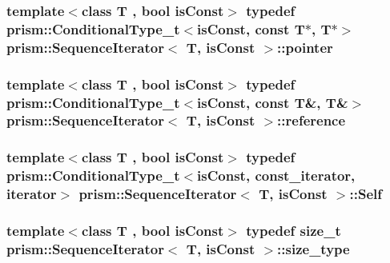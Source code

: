 \subsubsection[{\texorpdfstring{pointer}{pointer}}]{\setlength{\rightskip}{0pt plus 5cm}template$<$class T , bool is\+Const$>$ typedef {\bf prism\+::\+Conditional\+Type\+\_\+t}$<$is\+Const, const T$\ast$, T$\ast$$>$ {\bf prism\+::\+Sequence\+Iterator}$<$ T, is\+Const $>$\+::{\bf pointer}}\hypertarget{structprism_1_1_sequence_iterator_a024492122445836e94097e10b02b700a}{}\label{structprism_1_1_sequence_iterator_a024492122445836e94097e10b02b700a}
\subsubsection[{\texorpdfstring{reference}{reference}}]{\setlength{\rightskip}{0pt plus 5cm}template$<$class T , bool is\+Const$>$ typedef {\bf prism\+::\+Conditional\+Type\+\_\+t}$<$is\+Const, const T\&, T\&$>$ {\bf prism\+::\+Sequence\+Iterator}$<$ T, is\+Const $>$\+::{\bf reference}}\hypertarget{structprism_1_1_sequence_iterator_a4039950f81c7604c1dba682faddf5652}{}\label{structprism_1_1_sequence_iterator_a4039950f81c7604c1dba682faddf5652}
\subsubsection[{\texorpdfstring{Self}{Self}}]{\setlength{\rightskip}{0pt plus 5cm}template$<$class T , bool is\+Const$>$ typedef {\bf prism\+::\+Conditional\+Type\+\_\+t}$<$is\+Const, {\bf const\+\_\+iterator}, {\bf iterator}$>$ {\bf prism\+::\+Sequence\+Iterator}$<$ T, is\+Const $>$\+::{\bf Self}}\hypertarget{structprism_1_1_sequence_iterator_a795689f7bf3a16b6c40cfc81879467b2}{}\label{structprism_1_1_sequence_iterator_a795689f7bf3a16b6c40cfc81879467b2}
\subsubsection[{\texorpdfstring{size\+\_\+type}{size_type}}]{\setlength{\rightskip}{0pt plus 5cm}template$<$class T , bool is\+Const$>$ typedef size\+\_\+t {\bf prism\+::\+Sequence\+Iterator}$<$ T, is\+Const $>$\+::{\bf size\+\_\+type}}\hypertarget{structprism_1_1_sequence_iterator_a5a9c57ebdda1cd8eb2e4b3ddbd627fcf}{}\label{structprism_1_1_sequence_iterator_a5a9c57ebdda1cd8eb2e4b3ddbd627fcf}
